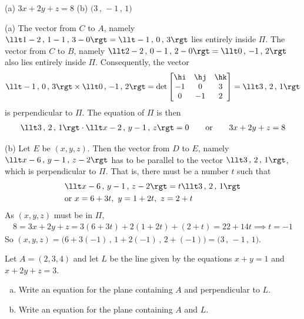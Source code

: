 %

\begin{answer}
(a) $3x+2y+z = 8$\qquad
(b) $\big(3\,,\,-1\,,\,1\big)$
\end{answer}

\begin{solution}
(a)
The vector from $C$ to $A$, namely 
 $\llt 1-2\,,\,1-1\,,\,3-0\rgt = \llt -1\,,\,0\,,\,3\rgt$ lies entirely inside 
$\Pi$. 
The vector from $C$ to $B$, namely 
 $\llt 2-2\,,\,0-1\,,\,2-0\rgt = \llt 0\,,\,-1\,,\,2\rgt$ also
lies entirely inside  $\Pi$.  Consequently, the vector
\begin{align*}
\llt -1\,,\,0\,,\,3\rgt\times \llt 0\,,\,-1\,,\,2\rgt
=\det\left[\begin{matrix}
            \hi  &  \hj  &  \hk \\
            -1    &  0   &    3 \\
            0    &   -1   &    2 
            \end{matrix}\right]
=\llt 3 \,,\, 2 \,,\, 1 \rgt
\end{align*}
is perpendicular to $\Pi$. The equation of $\Pi$ is then
\begin{align*}
\llt 3 \,,\, 2 \,,\, 1 \rgt \cdot \llt x-2 \,,\, y-1 \,,\, z \rgt = 0
\qquad\text{or}\qquad
3x+2y+z = 8
\end{align*}

(b) Let $E$ be $(x,y,z)$. Then the vector from $D$ to $E$,
namely $\llt x-6\,,\,y-1\,,\,z-2\rgt$ has to be parallel to
the vector $\llt 3 \,,\, 2 \,,\, 1 \rgt$, which is perpendicular to
$\Pi$. That is, there must be a number $t$ such that
\begin{align*}
& \llt x-6\,,\,y-1\,,\,z-2\rgt = t \llt 3 \,,\, 2 \,,\, 1 \rgt \\
&\text{or }x=6+3t,\ y=1+2t,\ z=2+t
\end{align*}
As $(x,y,z)$ must be in $\Pi$,
\begin{align*}
8 = 3x+2y+z = 3(6+3t) + 2(1+2t) +(2+t) = 22 +14 t
\implies t=-1
\end{align*}
So $(x,y,z) = \big(6+3(-1)\,,\,1+2(-1)\,,\,2+(-1)\big)
            = \big(3\,,\,-1\,,\,1\big)$.
\end{solution}

\begin{question}[M200 2011A] %
Let $A = (2, 3, 4)$ and let $L$ be the line given by the equations $x + y = 1$ and
$x + 2y + z = 3$.
\begin{enumerate}[(a)]
\item
Write an equation for the plane containing $A$ and perpendicular to $L$.
\item
Write an equation for the plane containing $A$ and $L$.
\end{enumerate}
\end{question}

